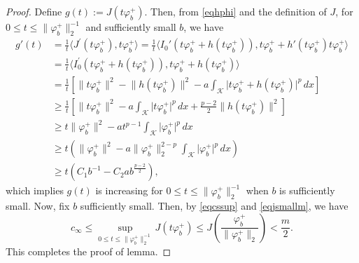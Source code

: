 \documentclass[10pt,a4paper]{amsart}
\newcommand{\K}{\mathcal{K}}
\newcommand{\abs}[1]{\lvert#1\rvert}
\newcommand{\norm}[1]{\lVert#1\rVert}
\begin{document}
\begin{proof}
Define $g(t):=J(t\varphi_b^+)$. Then, from \eqref{eqhphi} and the definition of $J$, for $0 \leq t \leq\norm{\varphi_b^+}_{2} ^{-1}$ and sufficiently small $b$, we have
$$
\begin{aligned}
g'(t) & =\frac{1}{t}\langle J^{\prime}(t\varphi_b^+), t\varphi_b^+\rangle=\frac{1}{t}\langle I_0'(t\varphi_b^++h(t\varphi_b^+)), t \varphi_b^++h'(t\varphi_b^+) t\varphi_b^+\rangle \\
& =\frac{1}{t}\langle I_0^{\prime}(t\varphi_b^++h(t\varphi_b^+)), t\varphi_b^+ + h(t\varphi_b^+)\rangle \\
& =\frac{1}{t}\left[\norm{t\varphi_b^+}^2-\norm{h(t\varphi_b^+)}^2-a\int_{\K} \abs{t\varphi_b^+ + h(t\varphi_b^+)}^p \,dx\right]\\
& \geq \frac{1}{t}\left[\norm{t\varphi_b^+}^{2}-a\int_{\K}\abs{t\varphi_b^+}^{p}\,dx+\frac{p-2}{2}\norm{h(t\varphi_b^+)}^{2}\right] \\
& \geq t\norm{\varphi_b^+}^2-at^{p-1}\int_{\K} \abs{\varphi_b^+}^{p} \,dx \\
& \geq t\left(\norm{\varphi_b^+}^2-a\norm{\varphi_b^+}_{2}^{2-p}\int_{\K} \abs{\varphi_b^+}^{p} \,dx\right)\\
& \geq t(C_1b^{-1} - C_2ab^\frac{p-2}{2}),
\end{aligned}
$$
which implies $g(t)$ is increasing for $0 \leq t \leq\norm{\varphi_b^+}_{2} ^{-1}$ when $b$ is sufficiently small. Now, fix $b$ sufficiently small. Then, by \eqref{eqcssup} and \eqref{eqjsmallm}, we have
$$
c_{\infty} \leq \sup _{0 \leq t \leq\norm{\varphi_b^+}_{2} ^{-1}} J(t\varphi_b^+) \leq J(\frac{\varphi_b^+}{\norm{\varphi_b^+}_2}) < \frac{m}{2}.
$$
This completes the proof of lemma.
\end{proof}
\end{document}
